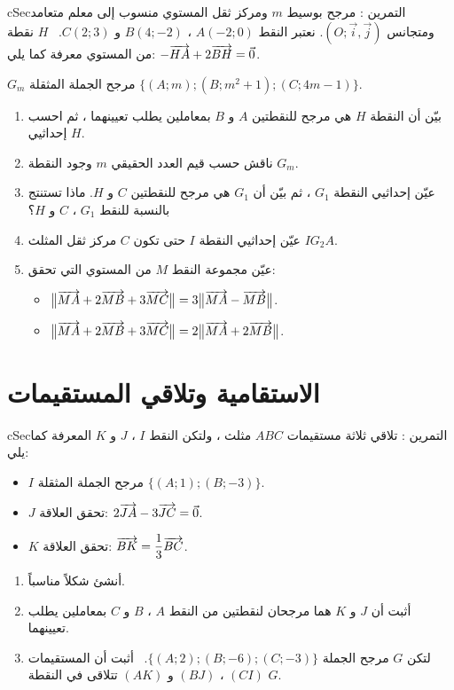 \documentclass[12pt,a4paper]{article}
\newenvironment{BOX}[2]{\begin{otherlanguage}{english}\begin{arbox}{#1}{#2}}{\end{arbox}\end{otherlanguage}}
\newcounter{exo}
\newenvironment{tamrin}[1]{\stepcounter{exo}\begin{BOX}{cSec}{التمرين \theexo: #1}}{\end{BOX}}
\newenvironment{sq}{\begin{itemize}[leftmargin=2.4em,itemsep=3pt]}{\end{itemize}}
\newcommand{\qa}{\item[(أ)]}\newcommand{\qb}{\item[(ب)]}\newcommand{\qc}{\item[(جـ)]}\newcommand{\qd}{\item[(د)]}\newcommand{\qe}{\item[(هـ)]}
\begin{document}
\begin{tamrin}{مرجح بوسيط $m$ ومركز ثقل}
المستوي منسوب إلى معلم متعامد ومتجانس $(O;\vec i,\vec j)$. نعتبر النقط $A(-2;0)$ ، $B(4;-2)$ و $C(2;3)$. \ $H$ نقطة من المستوي معرفة كما يلي: $-\overrightarrow{HA}+2\overrightarrow{BH}=\vec0$.\par
$G_m$ مرجح الجملة المثقلة $\{(A;m);(B;m^2+1);(C;4m-1)\}$.
\begin{enumerate}
\item بيّن أن النقطة $H$ هي مرجح للنقطتين $A$ و $B$ بمعاملين يطلب تعيينهما ، ثم احسب إحداثيي $H$.
\item ناقش حسب قيم العدد الحقيقي $m$ وجود النقطة $G_m$.
\item عيّن إحداثيي النقطة $G_1$ ، ثم بيّن أن $G_1$ هي مرجح للنقطتين $C$ و $H$. ماذا تستنتج بالنسبة للنقط $G_1$ ، $C$ و $H$؟
\item عيّن إحداثيي النقطة $I$ حتى تكون $C$ مركز ثقل المثلث $IG_2A$.
\item عيّن مجموعة النقط $M$ من المستوي التي تحقق:
\begin{sq}
\qa $\big\|\overrightarrow{MA}+2\overrightarrow{MB}+3\overrightarrow{MC}\big\|=3\big\|\overrightarrow{MA}-\overrightarrow{MB}\big\|$.
\qb $\big\|\overrightarrow{MA}+2\overrightarrow{MB}+3\overrightarrow{MC}\big\|=2\big\|\overrightarrow{MA}+2\overrightarrow{MB}\big\|$.
\end{sq}
\end{enumerate}
\end{tamrin}

\section{الاستقامية وتلاقي المستقيمات}
\begin{tamrin}{تلاقي ثلاثة مستقيمات}
$ABC$ مثلث ، ولتكن النقط $I$ ، $J$ و $K$ المعرفة كما يلي:
\begin{itemize}
\item $I$ مرجح الجملة المثقلة $\{(A;1);(B;-3)\}$.
\item $J$ تحقق العلاقة: $2\overrightarrow{JA}-3\overrightarrow{JC}=\vec0$.
\item $K$ تحقق العلاقة: $\overrightarrow{BK}=\dfrac13\overrightarrow{BC}$.
\end{itemize}
\begin{enumerate}
\item أنشئ شكلاً مناسباً.
\item أثبت أن $J$ و $K$ هما مرجحان لنقطتين من النقط $A$ ، $B$ و $C$ بمعاملين يطلب تعيينهما.
\item لتكن $G$ مرجح الجملة $\{(A;2);(B;-6);(C;-3)\}$. \ أثبت أن المستقيمات $(CI)$ ، $(BJ)$ و $(AK)$ تتلاقى في النقطة $G$.
\end{enumerate}
\end{tamrin}
\end{document}
